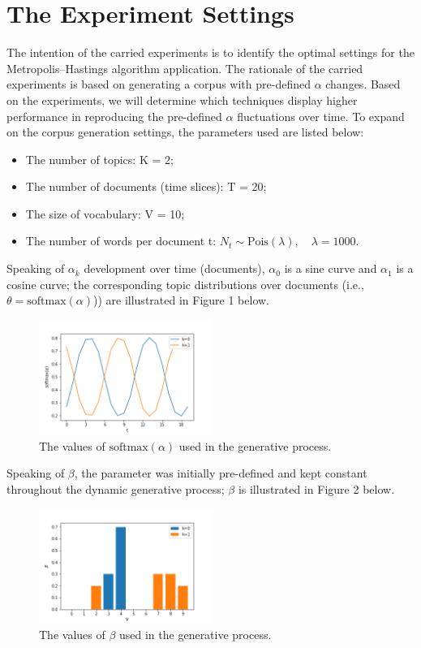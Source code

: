 \documentclass[12pt]{article}
\begin{document}

\section*{The Experiment Settings}

\par The intention of the carried experiments is to identify the optimal settings for the Metropolis--Hastings algorithm application. 
The rationale of the carried experiments is based on generating a corpus with pre-defined $\alpha$ changes. Based on the experiments, we will determine which techniques display higher performance in reproducing the pre-defined $\alpha$ fluctuations over time. To expand on the corpus generation settings, the parameters used are listed below:
\begin{itemize}
  \item The number of topics: K = 2;
  \item The number of documents (time slices): T = 20;
  \item The size of vocabulary: V = 10;
  \item The number of words per document t: $N_t \sim \mbox{Pois}(\lambda),\quad \lambda = 1000$.
\end{itemize}
Speaking of $\alpha_k$ development over time (documents), $\alpha_0$ is a sine curve and $\alpha_1$ is a cosine curve; the corresponding topic distributions over documents (i.e., $\theta = \mbox{softmax}(\alpha)$)) are illustrated in Figure 1 below.
\begin{figure}[H]
  \centering
  \includegraphics[width=0.5\textwidth]{theta_initial}
  \caption{The values of $\mbox{softmax}(\alpha)$ used in the generative process.}
\end{figure}
Speaking of $\beta$, the parameter was initially pre-defined and kept constant throughout the dynamic generative process; $\beta$ is illustrated in Figure 2 below.
\begin{figure}[H]
  \centering
  \includegraphics[width=0.5\textwidth]{beta_initial}
  \caption{The values of $\beta$ used in the generative process.}
\end{figure}
\end{document}
